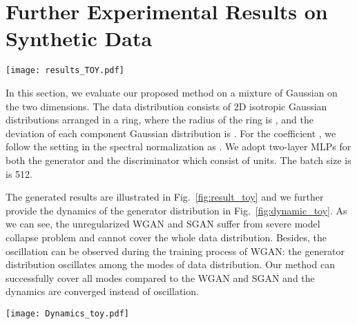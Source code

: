 \documentclass{article}
\newcommand{\fig}[1]{Fig.~\ref{fig:#1}}
\theoremstyle{definition}
\begin{document}
\section{Further Experimental Results on Synthetic Data}

\begin{figure*}
    \centering
    \texttt{[image: results\_TOY.pdf]}
\caption{The generated samples for mixture of gaussian distribution. The red points demonstrate the location of data distribution and the blue points are generated samples. Each distribution is plotted using kernel density estimation with 50,000 samples. }
    \label{fig:result_toy}
\end{figure*}

In this section, we evaluate our proposed method on a mixture of Gaussian on the two dimensions. The data distribution consists of  2D isotropic Gaussian distributions arranged in a ring, where the radius of the ring is , and the deviation of each component Gaussian distribution is . For the coefficient , we follow the setting in the spectral normalization as . We adopt two-layer MLPs for both the generator and the discriminator which consist of  units. The batch size is is 512.

The generated results are illustrated in \fig{result_toy} and we further provide the dynamics of the generator distribution in \fig{dynamic_toy}. As we can see, the unregularized WGAN and SGAN suffer from severe model collapse problem and cannot cover the whole data distribution. Besides, the oscillation can be observed during the training process of WGAN: the generator distribution oscillates among the modes of data distribution.
Our method can successfully cover all modes compared to the WGAN and SGAN and the dynamics are converged instead of oscillation.



\begin{figure*}
    \centering
    \texttt{[image: Dynamics\_toy.pdf]}
    \caption{The training dynamics of various GANs on synthetic data.}
    \label{fig:dynamic_toy}
\end{figure*}
\end{document}
